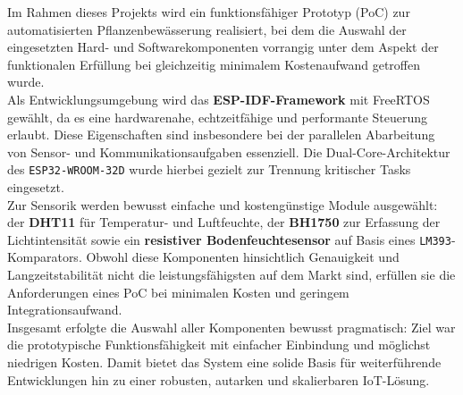 \vspace{2em}
\noindent Im Rahmen dieses Projekts wird ein funktionsfähiger Prototyp (PoC) zur automatisierten Pflanzenbewässerung realisiert, bei dem die Auswahl der eingesetzten Hard- und Softwarekomponenten vorrangig unter dem Aspekt der funktionalen Erfüllung bei gleichzeitig minimalem Kostenaufwand getroffen wurde.
\\
Als Entwicklungsumgebung wird das \textbf{ESP-IDF-Framework} mit FreeRTOS gewählt, da es eine hardwarenahe, echtzeitfähige und performante Steuerung erlaubt. Diese Eigenschaften sind insbesondere bei der parallelen Abarbeitung von Sensor- und Kommunikationsaufgaben essenziell. Die Dual-Core-Architektur des \texttt{ESP32-WROOM-32D} wurde hierbei gezielt zur Trennung kritischer Tasks eingesetzt.
\\
Zur Sensorik werden bewusst einfache und kostengünstige Module ausgewählt: der \textbf{DHT11} für Temperatur- und Luftfeuchte, der \textbf{BH1750} zur Erfassung der Lichtintensität sowie ein \textbf{resistiver Bodenfeuchtesensor} auf Basis eines \texttt{LM393}-Komparators. Obwohl diese Komponenten hinsichtlich Genauigkeit und Langzeitstabilität nicht die leistungsfähigsten auf dem Markt sind, erfüllen sie die Anforderungen eines PoC bei minimalen Kosten und geringem Integrationsaufwand.\\
Insgesamt erfolgte die Auswahl aller Komponenten bewusst pragmatisch: Ziel war die prototypische Funktionsfähigkeit mit einfacher Einbindung und möglichst niedrigen Kosten. Damit bietet das System eine solide Basis für weiterführende Entwicklungen hin zu einer robusten, autarken und skalierbaren IoT-Lösung.




